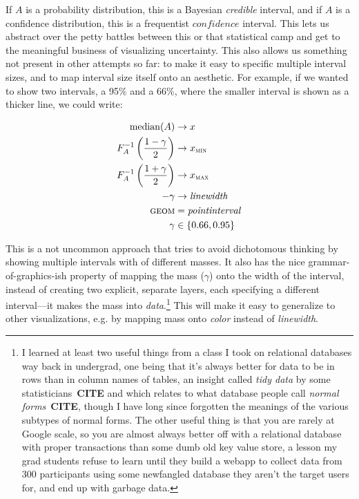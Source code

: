 \documentclass[journal]{vgtc}                     %
\begin{document}
If $A$ is a probability distribution, this is a Bayesian \textit{credible }interval, and if $A$ is a confidence distribution, this is a frequentist $confidence$ interval. This lets us abstract over the petty battles between this or that statistical camp and get to the meaningful business of visualizing uncertainty. This also allows us something not present in other attempts so far: to make it easy to specific multiple interval sizes, and to map interval size itself onto an aesthetic. For example, if we wanted to show two intervals, a 95\% and a 66\%, where the smaller interval is shown as a thicker line, we could write:


\begin{align*}
\operatorname{median}(A) &\rightarrow x\\
F_A^{-1}\left(\frac{1 - \gamma}{2}\right) &\rightarrow x_\textsc{min}\\
F_A^{-1}\left(\frac{1 + \gamma}{2}\right) &\rightarrow x_\textsc{max}\\
-\gamma &\rightarrow \mathit{linewidth}\\
\textsc{geom} &= \mathit{pointinterval}\\
\gamma &\in \{0.66, 0.95\}
\end{align*}

This is a not uncommon approach that tries to avoid dichotomous thinking by showing multiple intervals with of different masses. It also has the nice grammar-of-graphics-ish property of mapping the mass ($\gamma$) onto the width of the interval, instead of creating two explicit, separate layers, each specifying a different interval---it makes the mass into \textit{data}.\footnote{I learned at least two useful things from a class I took on relational databases way back in undergrad, one being that it's always better for data to be in rows than in column names of tables, an insight called \textit{tidy data} by some statisticians~\textbf{CITE} and which relates to what database people call \textit{normal forms}~\textbf{CITE}, though I have long since forgotten the meanings of the various subtypes of normal forms. The other useful thing is that you are rarely at Google scale, so you are almost always better off with a relational database with proper transactions than some dumb old key value store, a lesson my grad students refuse to learn until they build a webapp to collect data from 300 participants using some newfangled database they aren't the target users for, and end up with garbage data.} This will make it easy to generalize to other visualizations, e.g. by mapping mass onto \textit{color} instead of \textit{linewidth}.
\end{document}

